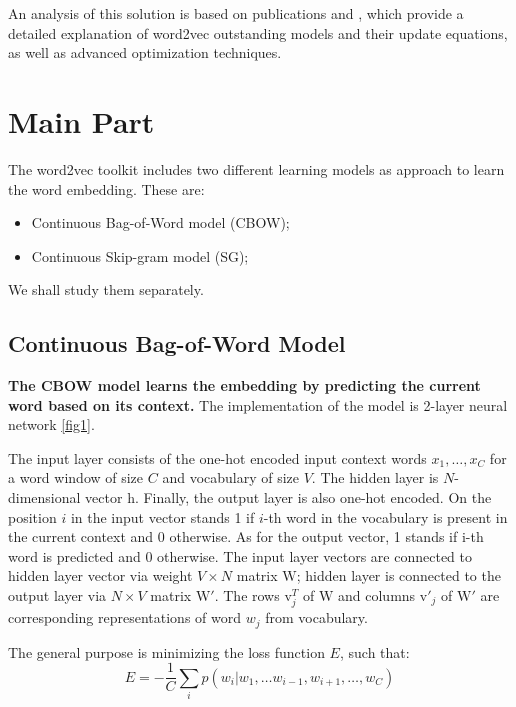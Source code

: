 \documentclass[conference, ]{IEEEtran}
\begin{document}
    An analysis of this solution is based on publications \cite{xin} and \cite{goldlevy}, which provide a detailed explanation of word2vec outstanding models and their update equations, as well as advanced optimization techniques.  
    
    \section*{Main Part}
    The word2vec toolkit includes two different learning models as approach to learn the word embedding. These are:
    \begin{itemize}
    	\item Continuous Bag-of-Word model (CBOW);
    	\item Continuous Skip-gram model (SG);
    \end{itemize}

	We shall study them separately.
    \subsection*{Continuous Bag-of-Word Model} 
    \textbf{The CBOW model learns the embedding by predicting the current word based on its context.}
    The implementation of the model is 2-layer neural network \ref{fig1}.
    
     
    The input layer consists of the one-hot encoded input context words $x_1, \dots, x_C$ for a word window of size $C$ and vocabulary of size $V$. The hidden layer is $N$-dimensional vector $\mathrm{h}$. Finally, the output layer is also one-hot encoded. On the position
    $i$ in the input vector stands 1 if $i$-th word in the vocabulary is present in the current context and 0 otherwise. As for the output vector, 1
    stands if i-th word is predicted and 0 otherwise.
    The input layer vectors are connected to hidden layer vector via weight $V\times N$ matrix $\mathrm{W}$; hidden layer is connected to the output layer via $N\times V$ matrix $\mathrm{W}'$. The rows $\mathrm{v}_j^T$ of $\mathrm{W}$ and columns $\mathrm{v}'_j$ of $\mathrm{W}'$ are corresponding representations of word $w_j$ from vocabulary.
    
    The general purpose is minimizing the loss function $E$, such that:
    \[
    E=-\frac{1}{C}\sum_{i}p(w_i|w_1,\ldots w_{i-1}, w_{i+1},\ldots, w_C)
    \]
    
\end{document}
